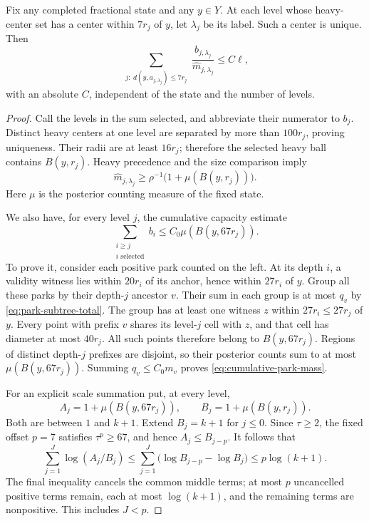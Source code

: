 \begin{lemma}\label{lem:park-coefficients}
Fix any completed fractional state and any $y\in Y$.  At each level
whose heavy-center set has a center within $7r_j$ of $y$, let
$\lambda_j$ be its label.  Such a center is unique.  Then
\begin{equation}\label{eq:pointwise-park-coefficients}
 \sum_{\substack{j:\ d(y,a_{j,\lambda_j})\le7r_j}}
                \frac{b_{j,\lambda_j}}{\widehat m_{j,\lambda_j}}
 \le C\ell,
\end{equation}
with an absolute $C$, independent of the state and the number of levels.
\end{lemma}

\begin{proof}
Call the levels in the sum selected, and abbreviate their numerator to
$b_j$.  Distinct heavy centers at one level are separated by more than
$100r_j$, proving uniqueness.  Their radii are at least $16r_j$;
therefore the selected heavy ball contains $B(y,r_j)$.  Heavy precedence
and the size comparison imply
\begin{equation}\label{eq:park-denominator-lower}
 \widehat m_{j,\lambda_j}
       \ge\rho^{-1}\bigl(1+\mu(B(y,r_j))\bigr).
\end{equation}
Here $\mu$ is the posterior counting measure of the fixed state.

We also have, for every level $j$, the cumulative capacity estimate
\begin{equation}\label{eq:cumulative-park-mass}
 \sum_{\substack{i\ge j\\i\text{ selected}}}b_i
                      \le C_0\mu(B(y,67r_j)).
\end{equation}
To prove it, consider each positive park counted on the left.  At its
depth $i$, a validity witness lies within $20r_i$ of its anchor, hence
within $27r_i$ of $y$.  Group all these parks by their depth-$j$
ancestor $v$.  Their sum in each group is at most $q_v$ by
\eqref{eq:park-subtree-total}.  The group has at least one witness $z$
within $27r_i\le27r_j$ of $y$.  Every point with prefix $v$ shares its
level-$j$ cell with $z$, and that cell has diameter at most $40r_j$.
All such points therefore belong to $B(y,67r_j)$.  Regions of distinct
depth-$j$ prefixes are disjoint, so their posterior counts sum to at
most $\mu(B(y,67r_j))$.  Summing $q_v\le C_0m_v$ proves
\eqref{eq:cumulative-park-mass}.

For an explicit scale summation put, at every level,
\[
 A_j=1+\mu(B(y,67r_j)),\qquad B_j=1+\mu(B(y,r_j)).
\]
Both are between $1$ and $k+1$.  Extend $B_j=k+1$ for $j\le0$.
Since $\tau\ge2$, the fixed offset $p=7$ satisfies $\tau^p\ge67$,
and hence $A_j\le B_{j-p}$.  It follows that
\begin{equation}\label{eq:park-log-telescope}
 \sum_{j=1}^J\log(A_j/B_j)
 \le\sum_{j=1}^J\bigl(\log B_{j-p}-\log B_j\bigr)
 \le p\log(k+1).
\end{equation}
The final inequality cancels the common middle terms; at most $p$
uncancelled positive terms remain, each at most $\log(k+1)$, and the
remaining terms are nonpositive.  This includes $J<p$.


\end{proof}
